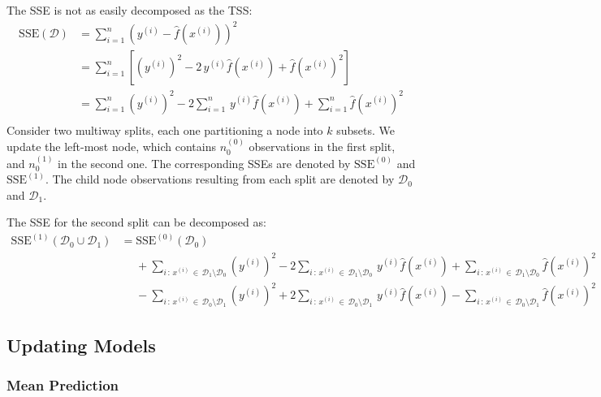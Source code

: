 \documentclass[a4paper, 11pt]{article}
\begin{document}
The SSE is not as easily decomposed as the TSS:
\begin{align*}
\text{SSE}(\mathcal{D}) &= \sum_{i = 1}^{n} \left(y^{(i)} - \hat{f}\left(x^{(i)}\right)\right)^2 \\
&= \sum_{i = 1}^{n} \left[\left(y^{(i)}\right)^2 - 2\, y^{(i)} \hat{f}\left(x^{(i)}\right) + \hat{f}\left(x^{(i)}\right)^2\right] \\
&= \sum_{i = 1}^{n} \left(y^{(i)}\right)^2 - 2 \sum_{i = 1}^{n} \,y^{(i)} \hat{f}\left(x^{(i)}\right) + \sum_{i = 1}^{n} \hat{f}\left(x^{(i)}\right)^2 \\
\end{align*}
Consider two multiway splits, each one partitioning a node into $k$ subsets. We update the left-most node, which contains $n_0^{(0)}$ observations in the first split, and $n_0^{(1)}$ in the second one. The corresponding SSEs are denoted by $\text{SSE}^{(0)}$ and $\text{SSE}^{(1)}$. The child node observations resulting from each split are denoted by $\mathcal{D}_0$ and $\mathcal{D}_1$.

The SSE for the second split can be decomposed as:
\begin{align}
\text{SSE}^{(1)}\left(\mathcal{D}_0 \cup \mathcal{D}_1\right) &= \text{SSE}^{(0)}(\mathcal{D}_0) \nonumber \\
&\phantom{{}={}} + \sum_{i \,:\, x^{(i)} \, \in \, \mathcal{D}_1 \setminus \mathcal{D}_0} \left(y^{(i)}\right)^2 - 2 \sum_{i \,:\, x^{(i)} \, \in \, \mathcal{D}_1 \setminus \mathcal{D}_0} \,y^{(i)} \hat{f}\left(x^{(i)}\right) + \sum_{i \,:\, x^{(i)} \, \in \, \mathcal{D}_1 \setminus \mathcal{D}_0} \hat{f}\left(x^{(i)}\right)^2 \nonumber \\
&\phantom{{}={}} - \sum_{i \,:\, x^{(i)} \, \in \, \mathcal{D}_0 \setminus \mathcal{D}_1} \left(y^{(i)}\right)^2 + 2 \sum_{i \,:\, x^{(i)} \, \in \, \mathcal{D}_0 \setminus \mathcal{D}_1} \,y^{(i)} \hat{f}\left(x^{(i)}\right) - \sum_{i \,:\, x^{(i)} \, \in \, \mathcal{D}_0 \setminus \mathcal{D}_1} \hat{f}\left(x^{(i)}\right)^2 \label{eq:SSE_update}
\end{align}

\subsection{Updating Models}

\subsubsection{Mean Prediction}
\end{document}
